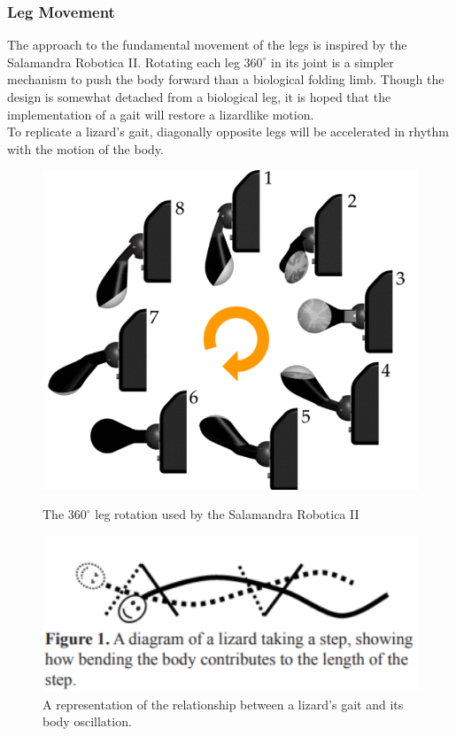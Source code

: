 \documentclass{article}
\begin{document}
\subsubsection{Leg Movement}
The approach to the fundamental movement of the legs is inspired by the Salamandra Robotica II.  Rotating each leg $360^\circ$ in its joint is a simpler mechanism to push the body forward than a biological folding limb. Though the design is somewhat detached from a biological leg, it is hoped that the implementation of a gait will restore a lizardlike motion.\\
To replicate a lizard's gait, diagonally opposite legs will be accelerated in rhythm with the motion of the body. 
\begin{figure}[H]
\begin{minipage}[t]{.4\textwidth}
\centering
\includegraphics[width=1\textwidth]{salamandraLegSpin}
\caption{The $360^\circ$ leg rotation used by the Salamandra Robotica II \citep{salamandra}}
\end{minipage}
\hfill
\begin{minipage}[t]{.55\textwidth}
\centering
\includegraphics[width=1\textwidth]{lizardGait}
\caption{A representation of the relationship between a lizard's gait and its body oscillation. \citep{reptileLocomotion}}
\end{minipage}
\end{figure}
\end{document}

